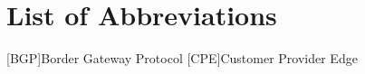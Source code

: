 \chapter{List of Abbreviations}
\begin{acronym}[CPE] %
    [BGP]{Border Gateway Protocol}
    [CPE]{Customer Provider Edge}
\end{acronym}